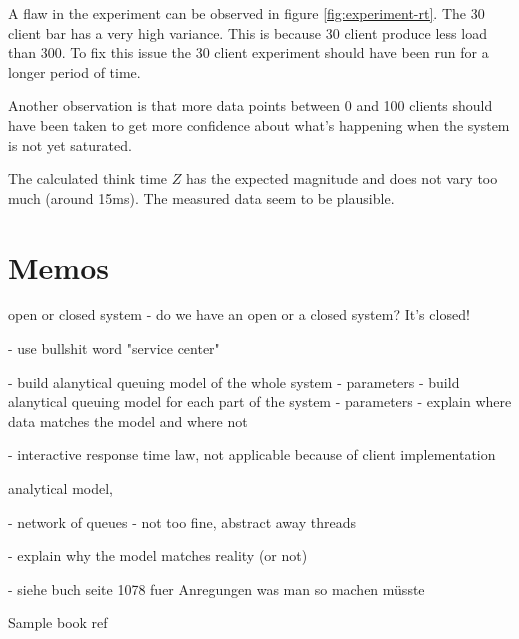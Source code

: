 \documentclass[a4paper]{article}
\begin{document}
A flaw in the experiment can be observed in figure \ref{fig:experiment-rt}. The 30 client bar has a very high variance. This is because 30 client produce less load than 300. To fix this issue the 30 client experiment should have been run for a longer period of time.

Another observation is that more data points between 0 and 100 clients should have been taken to get more confidence about what's happening when the system is not yet saturated.

The calculated think time $Z$ has the expected magnitude and does not vary too much (around 15ms). The measured data seem to be plausible.




\pagebreak

\section{Memos}

open or closed system
- do we have an open or a closed system? It's closed!

- use bullshit word "service center"

- build alanytical queuing model of the whole system
  - parameters
- build alanytical queuing model for each part of the system
  - parameters
- explain where data matches the model and where not

- interactive response time law, not applicable because of client implementation

analytical model, 


- network of queues
  - not too fine, abstract away threads
  
  
- explain why the model matches reality (or not)


- siehe buch seite 1078 fuer Anregungen was man so machen müsste

Sample book ref \cite[Page 556]{Raj}




\end{document}
